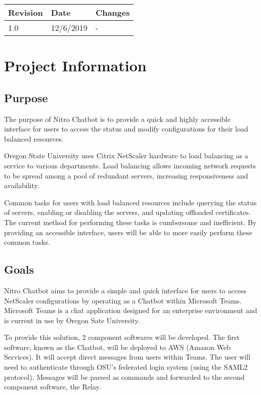 \documentclass[onecolumn, draftclsnofoot,10pt, compsoc]{IEEEtran}
\begin{document}
\begin{tabular}{ p{1in} p{1in} p{4in} }
 \textbf{Revision} & \textbf{Date} & \textbf{Changes} \\
 \hline
 1.0 & 12/6/2019 
 & - \\
 \hline
\end{tabular}

\clearpage

\section{Project Information}
\subsection{Purpose}
The purpose of Nitro Chatbot is to provide a quick and highly accessible interface for users to access the status and modify configurations for their load balanced resources. 

Oregon State University uses Citrix NetScaler hardware to load balancing as a service to various departments.
Load balancing allows incoming network requests to be spread among a pool of redundant servers, increasing responsiveness and availability.

Common tasks for users with load balanced resources include querying the status of servers, enabling or disabling the servers, and updating offloaded certificates.
The current method for performing these tasks is cumbersome and inefficient.
By providing an accessible interface, users will be able to more easily perform these common tasks.
\subsection{Goals}
Nitro Chatbot aims to provide a simple and quick interface for users to access NetScaler configurations by operating as a Chatbot within Microsoft Teams.
Microsoft Teams is a chat application designed for an enterprise environment and is current in use by Oregon Sate University.

To provide this solution, 2 component softwares will be developed.
The first software, known as the Chatbot, will be deployed to AWS (Amazon Web Services).
It will accept direct messages from users within Teams.
The user will need to authenticate through OSU's federated login system (using the SAML2 protocol).
Messages will be parsed as commands and forwarded to the second component software, the Relay.
\end{document}
